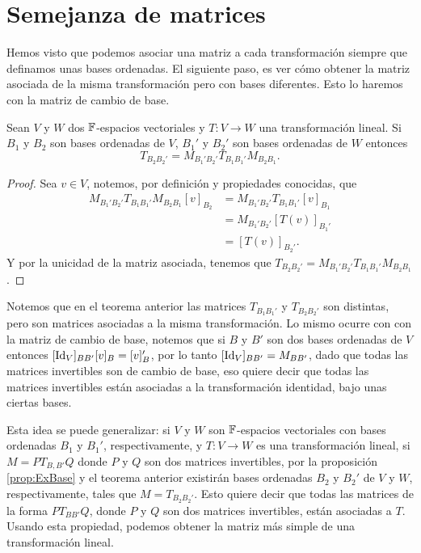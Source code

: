 \section{Semejanza de matrices}

Hemos visto que podemos asociar una matriz a cada transformación siempre que definamos unas bases ordenadas. El siguiente paso, es ver cómo obtener la matriz asociada de la misma transformación pero con bases diferentes. Esto lo haremos con la matriz de cambio de base.

\begin{teor}\label{teor:TLCambioBase}
  Sean $V$ y $W$ dos $\mathbb{F}$-espacios vectoriales y $T \colon V \to W$ una transformación lineal. Si $B_1$ y $B_2$ son bases ordenadas de $V$, $B_1'$ y $B_2'$ son bases ordenadas de $W$ entonces
  \[T_{B_2 B_2'} = M_{B_1' B_2'} T_{B_1 B_1'}M_{B_2 B_1}. \]
\end{teor}
\begin{proof}
  Sea $v \in V$, notemos, por definición y propiedades conocidas, que
  \begin{align*}
    M_{B_1' B_2'} T_{B_1 B_1'}M_{B_2 B_1} [v]_{B_2} &= M_{B_1' B_2'} T_{B_1 B_1'} [v]_{B_1} \\
      &= M_{B_1' B_2'} [T(v)]_{B_1'} \\
      &= [T(v)]_{B_2'}.
  \end{align*}
  Y por la unicidad de la matriz asociada, tenemos que $T_{B_2 B_2'} = M_{B_1' B_2'} T_{B_1 B_1'}M_{B_2 B_1}$.
\end{proof}

Notemos que en el teorema anterior las matrices $T_{B_1B_1'}$ y $T_{B_2B_2'}$ son distintas, pero son matrices asociadas a la misma transformación. Lo mismo ocurre con con la matriz de cambio de base, notemos que si $B$ y $B'$ son dos bases ordenadas de $V$ entonces $[\mathrm{Id}_V]_{BB'}[v]_B = [v]_B'$, por lo tanto $[\mathrm{Id}_V]_{BB'} = M_{BB'}$, dado que todas las matrices invertibles son de cambio de base, eso quiere decir que todas las matrices invertibles están asociadas a la transformación identidad, bajo unas ciertas bases.

Esta idea se puede generalizar: si $V$ y $W$ son $\mathbb{F}$-espacios vectoriales con bases ordenadas $B_1$ y $B_1'$, respectivamente, y $T\colon V \to W$ es una transformación lineal, si $M = PT_{B,B'}Q$ donde $P$ y $Q$ son dos matrices invertibles, por la proposición \ref{prop:ExBase} y el teorema anterior existirán bases ordenadas $B_2$ y $B_2'$ de $V$ y $W$, respectivamente, tales que $M = T_{B_2 B_2'}$. Esto quiere decir que todas las matrices de la forma $PT_{BB'}Q$, donde $P$ y $Q$ son dos matrices invertibles, están asociadas a $T$. Usando esta propiedad, podemos obtener la matriz más simple de una transformación lineal.

